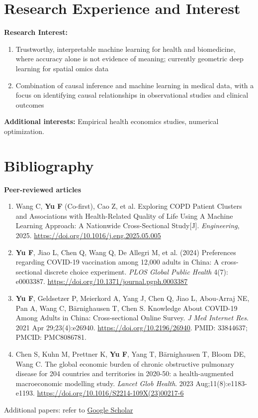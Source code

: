 \documentclass[10.5pt,letterpaper]{article}
\begin{document}
\section*{Research Experience and Interest}

\textbf{Research Interest:}
\begin{enumerate}[leftmargin=18pt,itemsep=1pt,topsep=2pt]
  \item Trustworthy, interpretable machine learning for health and biomedicine, where accuracy alone is not evidence of meaning; currently geometric deep learning for spatial omics data
  \item Combination of causal inference and machine learning in medical data, with a focus on identifying causal relationships in observational studies and clinical outcomes
\end{enumerate}
\textbf{Additional interests:} Empirical health economics studies, numerical optimization.

\section*{Bibliography}

\textbf{Peer-reviewed articles}
\begin{enumerate}[leftmargin=18pt,itemsep=3pt,topsep=2pt]
  \item Wang C, \textbf{Yu F} (Co-first), Cao Z, et al. Exploring COPD Patient Clusters and Associations with Health-Related Quality of Life Using A Machine Learning Approach: A Nationwide Cross-Sectional Study[J]. \textit{Engineering}, 2025. \url{https://doi.org/10.1016/j.eng.2025.05.005}
  \item \textbf{Yu F}, Jiao L, Chen Q, Wang Q, De Allegri M, et al. (2024) Preferences regarding COVID-19 vaccination among 12,000 adults in China: A cross-sectional discrete choice experiment. \textit{PLOS Global Public Health} 4(7): e0003387. \url{https://doi.org/10.1371/journal.pgph.0003387}
  \item \textbf{Yu F}, Geldsetzer P, Meierkord A, Yang J, Chen Q, Jiao L, Abou-Arraj NE, Pan A, Wang C, B\"arnighausen T, Chen S. Knowledge About COVID-19 Among Adults in China: Cross-sectional Online Survey. \textit{J Med Internet Res}. 2021 Apr 29;23(4):e26940. \url{https://doi.org/10.2196/26940}. PMID: 33844637; PMCID: PMC8086781.
  \item Chen S, Kuhn M, Prettner K, \textbf{Yu F}, Yang T, B\"arnighausen T, Bloom DE, Wang C. The global economic burden of chronic obstructive pulmonary disease for 204 countries and territories in 2020-50: a health-augmented macroeconomic modelling study. \textit{Lancet Glob Health}. 2023 Aug;11(8):e1183-e1193. \url{https://doi.org/10.1016/S2214-109X(23)00217-6}
\end{enumerate}
Additional papers: refer to \href{https://scholar.google.com/citations?user=7bPHV-AAAAAJ&hl=en}{Google Scholar}
\end{document}
